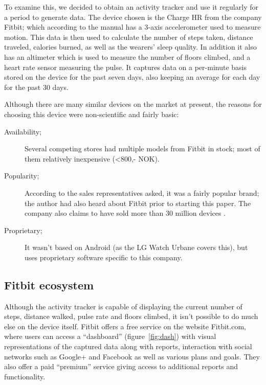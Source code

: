\documentclass[a4paper,11pt,dvips]{article}
\begin{document}
To examine this, we decided to obtain an activity tracker and use it regularly for a period to generate data. The device chosen is the Charge HR from the company Fitbit; which according to the manual has a 3-axis accelerometer used to measure motion. This data is then used to calculate the number of steps taken, distance traveled, calories burned, as well as the wearers' sleep quality. In addition it also has an altimeter which is used to measure the number of floors climbed, and a heart rate sensor measuring the pulse. It captures data on a per-minute basis stored on the device for the past seven days, also keeping an average for each day for the past 30 days.

Although there are many similar devices on the market at present, the reasons for choosing this device were non-scientific and fairly basic:

\begin{description}
\item[Availability;] Several competing stores had multiple models from Fitbit in stock; most of them relatively inexpensive (<800,- NOK).
\item[Popularity;] According to the sales representatives asked, it was a fairly popular brand; the author had also heard about Fitbit prior to starting this paper. The company also claims to have sold more than 30 million devices \citep{Fitbit:2015}.
\item[Proprietary;] It wasn't based on Android (as the LG Watch Urbane covers this), but uses proprietary software specific to this company.
\end{description}

\subsection{Fitbit ecosystem}
Although the activity tracker is capable of displaying the current number of steps, distance walked, pulse rate and floors climbed, it isn't possible to do much else on the device itself. Fitbit offers a free service on the website Fitbit.com, where users can access a “dashboard” (figure~\ref{fig:dash}) with visual representations of the captured data along with reports, interaction with social networks such as Google+ and Facebook as well as various plans and goals. They also offer a paid “premium” service giving access to additional reports and functionality.
\end{document}
